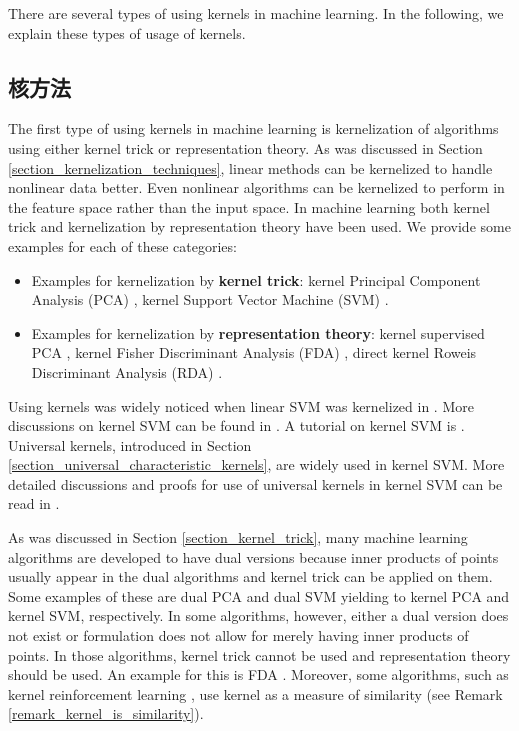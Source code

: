 \documentclass[lang=cn,10pt]{gorgeousnbook}
\numberwithin{equation}{section}%
\numberwithin{figure}{section}%
\begin{document}
There are several types of using kernels in machine learning. In the following, we explain these types of usage of kernels. 

\subsection{核方法}

The first type of using kernels in machine learning is kernelization of algorithms using either kernel trick or representation theory. As was discussed in Section \ref{section_kernelization_techniques}, linear methods can be kernelized to handle nonlinear data better. Even nonlinear algorithms can be kernelized to perform in the feature space rather than the input space.
In machine learning both kernel trick and kernelization by representation theory have been used. We provide some examples for each of these categories: 
\begin{itemize}[topsep=0pt,itemsep=-1ex,partopsep=1ex,parsep=1ex]
\item Examples for kernelization by \textbf{kernel trick}: kernel Principal Component Analysis (PCA) \cite{scholkopf1997kernel,scholkopf1998nonlinear,ghojogh2019unsupervised}, kernel Support Vector Machine (SVM) \cite{boser1992training,vapnik1995nature}.
\item Examples for kernelization by \textbf{representation theory}: kernel supervised PCA \cite{barshan2011supervised,ghojogh2019unsupervised}, kernel Fisher Discriminant Analysis (FDA) \cite{mika1999fisher,ghojogh2019fisher}, direct kernel Roweis Discriminant Analysis (RDA) \cite{ghojogh2020generalized}. 
\end{itemize}

Using kernels was widely noticed when linear SVM \cite{vapnik1974theory} was kernelized in \cite{boser1992training,vapnik1995nature}.
More discussions on kernel SVM can be found in \cite{scholkopf1997comparing,hastie2009elements}. A tutorial on kernel SVM is \cite{burges1998tutorial}. 
Universal kernels, introduced in Section \ref{section_universal_characteristic_kernels}, are widely used in kernel SVM. More detailed discussions and proofs for use of universal kernels in kernel SVM can be read in \cite{steinwart2008support}.

As was discussed in Section \ref{section_kernel_trick}, many machine learning algorithms are developed to have dual versions because inner products of points usually appear in the dual algorithms and kernel trick can be applied on them. Some examples of these are dual PCA \cite{scholkopf1997kernel,scholkopf1998nonlinear,ghojogh2019unsupervised} and dual SVM \cite{boser1992training,vapnik1995nature} yielding to kernel PCA and kernel SVM, respectively. 
In some algorithms, however, either a dual version does not exist or formulation does not allow for merely having inner products of points. In those algorithms, kernel trick cannot be used and representation theory should be used. An example for this is FDA \cite{ghojogh2019fisher}.
Moreover, some algorithms, such as kernel reinforcement learning \cite{ormoneit2002kernel}, use kernel as a measure of similarity (see Remark \ref{remark_kernel_is_similarity}).
\end{document}
